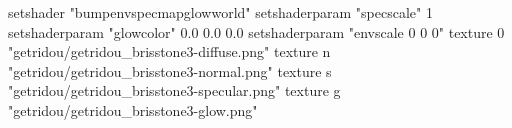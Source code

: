 setshader "bumpenvspecmapglowworld"
setshaderparam "specscale" 1
setshaderparam "glowcolor" 0.0 0.0 0.0
setshaderparam "envscale 0 0 0"
texture 0 "getridou/getridou_brisstone3-diffuse.png"
texture n "getridou/getridou_brisstone3-normal.png"
texture s "getridou/getridou_brisstone3-specular.png"
texture g "getridou/getridou_brisstone3-glow.png"
